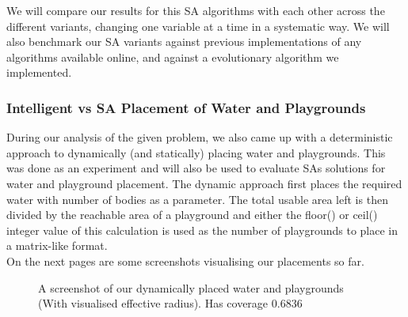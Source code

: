 \documentclass{article}
\begin{document}
We will compare our results for this SA algorithms with each other across the different variants, changing one variable at a time in a systematic way. We will also benchmark our SA variants against previous implementations of any algorithms available online, and against a evolutionary algorithm we implemented. 

\subsubsection{Intelligent vs SA Placement of Water and Playgrounds} %

During our analysis of the given problem, we also came up with a deterministic approach to dynamically (and statically) placing water and playgrounds. This was done as an experiment and will also be used to evaluate SAs solutions for water and playground placement. The dynamic approach first places the required water with number of bodies as a parameter. The total usable area left is then divided by the reachable area of a playground and either the floor() or ceil() integer value of this calculation is used as the number of playgrounds to place in a matrix-like format.
\\
On the next pages are some screenshots visualising our placements so far. 


\begin{figure}
  \caption{A screenshot of our dynamically placed water and playgrounds (With visualised effective radius). Has coverage 0.6836 }
  \label{fig:Dynamic Placement}
\end{figure}
\end{document}
